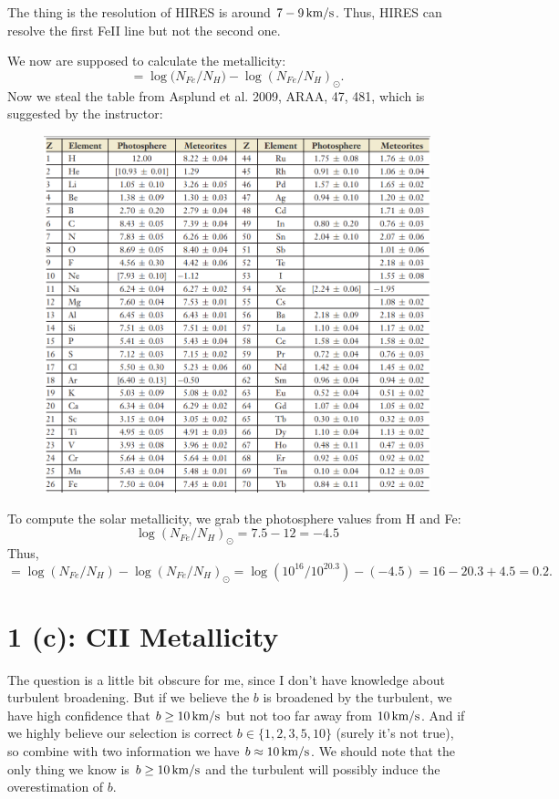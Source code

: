 \documentclass[12pt,letterpaper]{article}
\newcommand{\kms}{\textrm{\,km/s}}
\begin{document}
The thing is the resolution of HIRES is around $7-9 \kms$.
Thus, HIRES can resolve the first FeII line but not the second one.

We now are supposed to calculate the metallicity:
\begin{equation}
    [Fe/N] = \log{(N_{Fe} / N_H}) - \log{(N_{Fe} / N_H)}_\odot.
\end{equation}
Now we steal the table from  Asplund et al. 2009,
ARAA, 47, 481, which is suggested by the instructor:
\begin{figure}[H]
    \includegraphics[width=\columnwidth]{images/photosphere.png}
\end{figure}
To compute the solar metallicity, we grab the photosphere values from H and Fe:
\begin{equation*}
    \log{(N_{Fe} / N_H)}_\odot = 7.5 - 12 = -4.5
\end{equation*}
Thus,
\begin{equation*}
    [Fe/H] = 
    \log{(N_{Fe} / N_H)} - \log{(N_{Fe} / N_H)}_\odot =
    \log{(10^{16} / 10^{20.3})} - (-4.5) = 
    16 - 20.3 + 4.5 = 0.2.
\end{equation*}

\section*{1 (c): CII Metallicity}
The question is a little bit obscure for me, since I don't have knowledge about turbulent broadening.
But if we believe the $b$ is broadened by the turbulent, we have high confidence that $b \geq 10 \kms$ but not too far away from $10 \kms$.
And if we highly believe our selection is correct $b \in \{1, 2 ,3, 5, 10\}$ (surely it's not true), 
so combine with two information we have $b \approx 10 \kms$. 
We should note that the only thing we know is $b \geq 10 \kms$ and the turbulent will possibly induce the overestimation of $b$.
\end{document}
